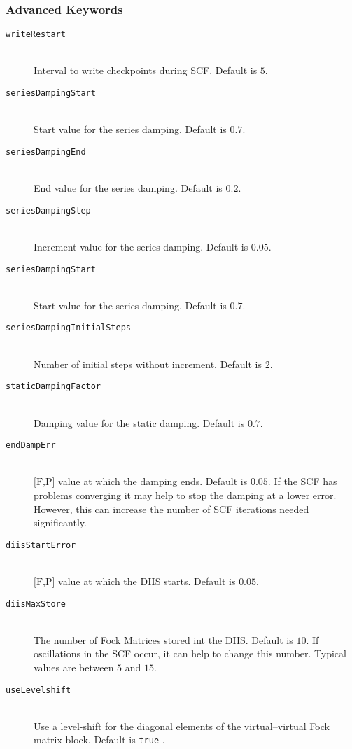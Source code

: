 \documentclass[bibliography=totocnumbered,a4paper,10pt,oneside]{scrbook}
\newcommand{\ttt}[1]{%
  \begingroup\setlength{\fboxsep}{1pt}%
  \colorbox{serenity-green!30}{\texttt{\hspace*{2pt}\vphantom{(g}#1\hspace*{2pt}}}%
  \endgroup
}
\begin{document}
\subsubsection{Advanced Keywords}
\begin{description}
    \item [\texttt{writeRestart}]\hfill \\
    Interval to write checkpoints during SCF. Default is $5$.
   \item [\texttt{seriesDampingStart}]\hfill \\
    Start value for the series damping. Default is $0.7$.
    \item [\texttt{seriesDampingEnd}]\hfill \\
    End value for the series damping. Default is $0.2$.
    \item [\texttt{seriesDampingStep}]\hfill \\
    Increment value for the series damping. Default is $0.05$.
    \item [\texttt{seriesDampingStart}]\hfill \\
    Start value for the series damping. Default is $0.7$.
    \item [\texttt{seriesDampingInitialSteps}]\hfill \\
    Number of initial steps without increment. Default is $2$.
    \item [\texttt{staticDampingFactor}]\hfill \\
    Damping value for the static damping. Default is $0.7$.
    \item [\texttt{endDampErr}]\hfill \\
    $\text{[F,P]}$ value at which the damping ends. Default is $0.05$.
    If the SCF has problems converging it may help to stop the damping at a lower error. However, this can
    increase the number of SCF iterations needed significantly.
    \item [\texttt{diisStartError}]\hfill \\
    $\text{[F,P]}$ value at which the DIIS starts. Default is $0.05$.
    \item [\texttt{diisMaxStore}]\hfill \\
    The number of Fock Matrices stored int the DIIS. Default is $10$. If oscillations in the SCF occur, it can
    help to change this number. Typical values are between $5$ and $15$.
    \item [\texttt{useLevelshift}]\hfill \\
    Use a level-shift for the diagonal elements of the virtual--virtual Fock matrix block. Default is \ttt{true}.

\end{description}
\end{document}
